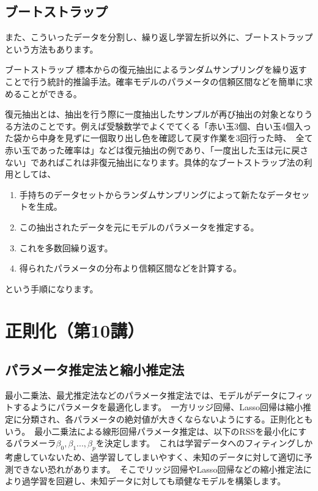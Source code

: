 \documentclass[uplatex]{jsarticle}
\begin{document}
\subsection{ブートストラップ}
また、こういったデータを分割し、繰り返し学習左折以外に、ブートストラップという方法もあります。
 \begin{itembox}[l]{ブートストラップ}
   標本からの復元抽出によるランダムサンプリングを繰り返すことで行う統計的推論手法。確率モデルのパラメータの信頼区間などを簡単に求めることができる。
 \end{itembox}
 復元抽出とは、抽出を行う際に一度抽出したサンプルが再び抽出の対象となりうる方法のことです。例えば受験数学でよくでてくる「赤い玉3個、白い玉4個入った袋から中身を見ずに一個取り出し色を確認して戻す作業を3回行った時、\
 全て赤い玉であった確率は」などは復元抽出の例であり、「一度出した玉は元に戻さない」であればこれは非復元抽出になります。具体的なブートストラップ法の利用としては、
 \begin{enumerate}
   \item 手持ちのデータセットからランダムサンプリングによって新たなデータセットを生成。
   \item この抽出されたデータを元にモデルのパラメータを推定する。
   \item これを多数回繰り返す。
   \item 得られたパラメータの分布より信頼区間などを計算する。
 \end{enumerate}
という手順になります。

\section{正則化（第10講）}
\subsection{パラメータ推定法と縮小推定法}
最小二乗法、最尤推定法などのパラメータ推定法では、モデルがデータにフィットするようにパラメータを最適化します。\
一方リッジ回帰、Lasso回帰は縮小推定に分類され、各パラメータの絶対値が大きくならないようにする。正則化ともいう。\
最小二乗法による線形回帰パラメータ推定は、以下の{\rm RSS}を最小化にするパラメーラ$\beta_0, \beta_1..., \beta_p$を決定します。\
これは学習データへのフィティングしか考慮していないため、過学習してしまいやすく、未知のデータに対して適切に予測できない恐れがあります。\
そこでリッジ回帰やLasso回帰などの縮小推定法により過学習を回避し、未知データに対しても頑健なモデルを構築します。
\end{document}
